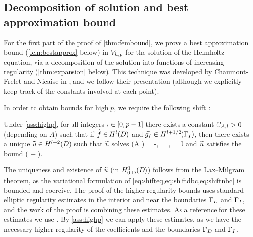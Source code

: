 \subsection{Decomposition of solution and best approximation bound}\label{sec:decomp}

For the first part of the proof of \cref{thm:fembound}, we prove a best approximation bound (\cref{lem:bestapprox} below) in $V_{h,p}$ for the solution of the Helmholtz equation, via a decomposition of the solution into functions of increasing regularity (\cref{thm:expansion} below). This technique was developed by Chaumont-Frelet and Nicaise in \cite{ChNi:19}, and we follow their presentation (although we explicitly keep track of the constants involved at each point).

In order to obtain bounds for high $p$, we require the following shift :

\label{thm:shift}
Under \cref{ass:highp}, for all integers $l \in \mleft[0,p-1\mright]$ there exists a constant $C_{A,l}>0$ (depending on $A$) such that if $\ftilde \in \HlD$ and $\gItilde \in \HlphGI$, then there exists a unique $\utilde \in \HlptD$ such that $\widetilde{u}$ solves
\beq\label{eq:shifteq}
\grad \cdot \mleft(A \grad \utilde\mright) = -\ftilde,
\eeq
\beq\label{eq:shiftdbc}
\dn \utilde = \gItilde, \tand
\eeq
\beq\label{eq:shiftnbc}
\trD \utilde = 0
\eeq
and $\widetilde{u}$ satisfies the bound
\beq\label{eq:shift}
\NHlptD{\utilde} \leq \CAl \mleft(\NHlD{\ftilde} + \NHlphGI{\gItilde}\mright).
\eeq
\enth

The uniqueness and existence of $\widetilde{u}$ (in $\HozDD$) follows from the Lax--Milgram theorem, as the variational formulation of \cref{eq:shifteq,eq:shiftdbc,eq:shiftnbc} is bounded and coercive. The proof of the higher regularity bounds uses standard elliptic regularity estimates in the interior and near the boundaries $\Gamma_{D}$ and $\Gamma_{I}$, and the work of the proof is combining these estimates. As a reference for these estimates we use \cite[pp. 137-138]{Mc:00}. By \cref{ass:highp} we can apply these estimates, as we have the necessary higher regularity of the coefficients and the boundaries $\Gamma_{D}$ and $\Gamma_{I}$.

